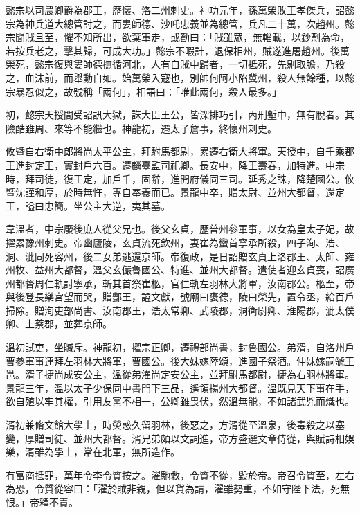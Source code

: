 \begin{pinyinscope}
 懿宗以司農卿爵為郡王，歷懷、洛二州刺史。神功元年，孫萬榮敗王孝傑兵，詔懿宗為神兵道大總管討之，而婁師德、沙吒忠義並為總管，兵凡二十萬，次趙州。懿宗聞賊且至，懼不知所出，欲棄軍走，或勸曰：「賊雖眾，無輜載，以鈔剽為命，若按兵老之，擊其歸，可成大功。」懿宗不暇計，退保相州，賊遂進屠趙州。後萬榮死，懿宗復與婁師德撫循河北，人有自賊中歸者，一切抵死，先剔取膽，乃殺之，血沫前，而舉動自如。始萬榮入寇也，別帥何阿小陷冀州，殺人無餘種，以懿宗暴忍似之，故號稱「兩何」，相語曰：「唯此兩何，殺人最多。」



 初，懿宗天授間受詔訊大獄，誅大臣王公，皆深排巧引，內刑塹中，無有脫者。其險酷雖周、來等不能繼也。神龍初，遷太子詹事，終懷州刺史。



 攸暨自右衛中郎將尚太平公主，拜駙馬都尉，累遷右衛大將軍。天授中，自千乘郡王進封定王，實封戶六百。遷麟臺監司祀卿。長安中，降王壽春，加特進。中宗時，拜司徒，復王定，加戶千，固辭，進開府儀同三司。延秀之誅，降楚國公。攸暨沈謹和厚，於時無忤，專自奉養而已。景龍中卒，贈太尉、並州大都督，還定王，謚曰忠簡。坐公主大逆，夷其墓。



 韋溫者，中宗廢後庶人從父兄也。後父玄貞，歷普州參軍事，以女為皇太子妃，故擢累豫州刺史。帝幽廬陵，玄貞流死欽州，妻崔為蠻首寧承所殺，四子洵、浩、洞、泚同死容州，後二女弟逃還京師。帝復政，是日詔贈玄貞上洛郡王、太師、雍州牧、益州大都督，溫父玄儼魯國公、特進、並州大都督。遣使者迎玄貞喪，詔廣州都督周仁軌討寧承，斬其首祭崔柩，官仁軌左羽林大將軍，汝南郡公。柩至，帝與後登長樂宮望而哭，贈酆王，謚文獻，號廟曰褒德，陵曰榮先，置令丞，給百戶掃除。贈洵吏部尚書、汝南郡王，浩太常卿、武陵郡，洞衛尉卿、淮陽郡，泚太僕卿、上蔡郡，並葬京師。



 溫初試吏，坐贓斥。神龍初，擢宗正卿，遷禮部尚書，封魯國公。弟湑，自洛州戶曹參軍事連拜左羽林大將軍，曹國公。後大妹嫁陸頌，進國子祭酒。仲妹嫁嗣虢王邕。湑子捷尚成安公主，溫從弟濯尚定安公主，並拜駙馬都尉，捷為右羽林將軍。景龍三年，溫以太子少保同中書門下三品，遙領揚州大都督。溫既見天下事在手，欲自殖以牢其權，引用友黨不相一，公卿雖畏伏，然溫無能，不如諸武兇而熾也。



 湑初兼脩文館大學士，時熒惑久留羽林，後惡之，方湑從至溫泉，後毒殺之以塞變，厚贈司徒、並州大都督。湑兄弟頗以文詞進，帝方盛選文章侍從，與賦詩相娛樂，湑雖為學士，常在北軍，無所造作。



 有富商抵罪，萬年令李令質按之。濯馳救，令質不從，毀於帝。帝召令質至，左右為恐，令質從容曰：「濯於賊非親，但以貨為請，濯雖勢重，不如守陛下法，死無恨。」帝釋不責。




\end{pinyinscope}
